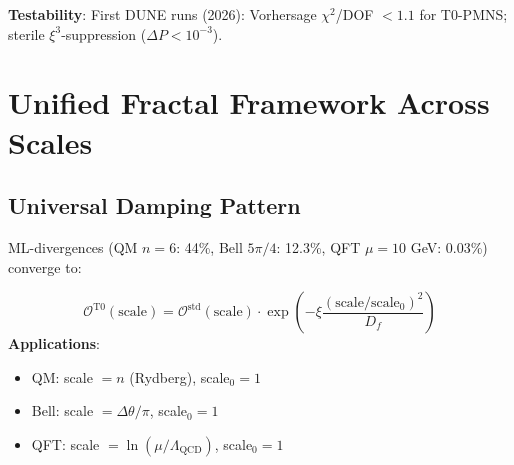 	\begin{table}[htbp]
		\centering
		\caption{DUNE-Relevant T0 Neutrino Predictions}
	\end{table}
	
	\textbf{Testability}: First DUNE runs (2026): Vorhersage $\chi^2$/DOF $<1.1$ for T0-PMNS; sterile $\xi^3$-suppression ($\Delta P<10^{-3}$).
	
	\section{Unified Fractal Framework Across Scales}
	
	\subsection{Universal Damping Pattern}
	
	ML-divergences (QM $n=6$: 44\%, Bell $5\pi/4$: 12.3\%, QFT $\mu=10$ GeV: 0.03\%) converge to:
	
	\begin{tcolorbox}[colback=orange!5!white,colframe=orange!75!black,title={Unified T0 Fractal Law}]
		\begin{equation}
			\mathcal{O}^{\text{T0}}(\text{scale}) = \mathcal{O}^{\text{std}}(\text{scale}) \cdot \exp\left(-\xi \frac{(\text{scale}/\text{scale}_0)^2}{D_f}\right) \tag{ML-Eq.~5.1}
		\end{equation}
		\textbf{Applications}:
		\begin{itemize}
			\item QM: scale $= n$ (Rydberg), scale$_0=1$
			\item Bell: scale $= \Delta\theta/\pi$, scale$_0=1$
			\item QFT: scale $= \ln(\mu/\Lambda_{\text{QCD}})$, scale$_0=1$
		\end{itemize}
	\end{tcolorbox}
	
